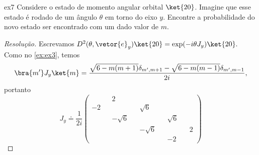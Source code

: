 \begin{exercício}{}{ex7}
    Considere o estado de momento angular orbital \(\ket{2 0}\). Imagine que esse estado é rodado de um ângulo \(\theta\) em torno do eixo \(y\). Encontre a probabilidade do novo estado ser encontrado com um dado valor de \(m\).
\end{exercício}
\begin{proof}[Resolução]
    Escrevamos \(D^2(\theta, \vetor{e}_y) \ket{20} = \exp(-i \theta J_y) \ket{20}.\) Como no \cref{ex:ex3}, temos
    \begin{equation*}
        \bra{m'}J_y\ket{m} = \frac{\sqrt{6 - m(m + 1)} \delta_{m', m+1} - \sqrt{6 - m(m-1)}\delta_{m', m-1}}{2i},
    \end{equation*}
    portanto
    \begin{equation*}
        J_y \doteq \frac{1}{2i}\begin{pmatrix}
             && 2 &&  &&  && \\
            -2 &&  && \sqrt{6} && &&\\
               && -\sqrt{6} &&  && \sqrt{6} &&\\
               &&  && -\sqrt{6} && && 2\\
               && && && -2 &&
        \end{pmatrix}
    \end{equation*}
\end{proof}
